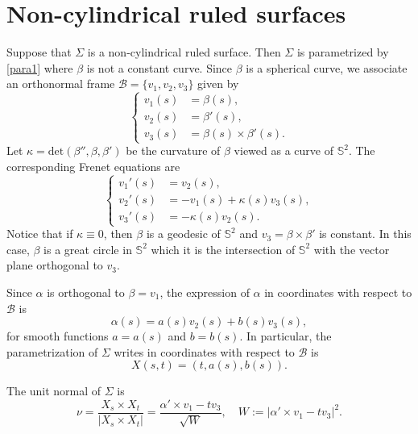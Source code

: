 \documentclass[12pt,a4paper,reqno]{amsart}
\def\s{\mathbb S}
\begin{document}
\section{Non-cylindrical  ruled surfaces } \label{s4}

Suppose that $\Sigma$ is a non-cylindrical ruled surface. Then $\Sigma$ is parametrized by \eqref{para1} where $\beta$ is not a constant curve. Since $\beta$ is a spherical curve, we associate an orthonormal frame $\mathcal{B}=\{v_1,v_2,v_3\}$ given by
\begin{equation*}
\left\{\begin{split}
v_1(s)&=\beta(s),\\
v_2(s)&=\beta'(s),\\
v_3(s)&=\beta(s)\times\beta'(s).
\end{split}
\right.
\end{equation*}
Let $\kappa=\mbox{det}(\beta'',\beta,\beta')$ be the curvature of $\beta$ viewed as a curve of $\s^2$. The corresponding Frenet equations are
\begin{equation*}
\left\{
\begin{split}
v_1'(s)&=v_2(s),\\
v_2'(s)&=-v_1(s)+\kappa(s) v_3(s),\\
v_3'(s)&=-\kappa(s) v_2(s).
\end{split}
\right.
\end{equation*}
Notice that if $\kappa\equiv 0$, then $\beta$ is a geodesic of $\s^2$ and $v_3=\beta\times\beta'$ is constant. In this case,  $\beta$ is a great circle in $\s^2$ which it is the intersection of $\s^2$ with the vector plane orthogonal to $v_3$.

Since $\alpha$ is orthogonal to $\beta=v_1$, the expression of $\alpha$ in coordinates with respect to $\mathcal{B}$ is 
$$\alpha(s)=a(s) v_2(s)+b(s) v_3(s),$$
for smooth functions $a=a(s)$ and $b=b(s)$. In particular, the parametrization of $\Sigma$ writes in coordinates with respect to $\mathcal{B}$ is
\begin{equation}\label{para}
X(s,t)=(t,a(s),b(s)).
\end{equation}



The unit normal of $\Sigma$ is 
$$\nu=\frac{X_s\times X_t}{|X_s\times X_t|}=\frac{\alpha'\times v_1- t v_3}{\sqrt{W}},\quad W:=|\alpha'\times v_1- t v_3|^2.$$
\end{document}
